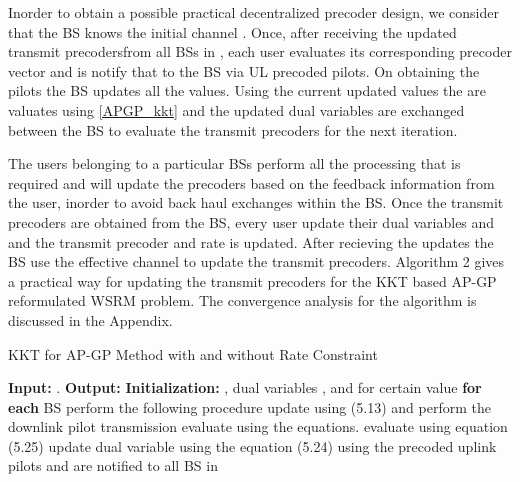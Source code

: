 Inorder to obtain a possible practical decentralized precoder design, we consider that the \ac{BS}  knows the initial channel . Once, after receiving the updated transmit precodersfrom all \ac{BS}s in , each user evaluates its corresponding precoder vector and is notify that to the \ac{BS} via \ac{UL} precoded pilots. On obtaining the pilots the \ac{BS} updates all the values. Using the current updated values the  are valuates using \eqref{APGP_kkt} and the updated dual variables are exchanged between the \ac{BS} to evaluate the transmit precoders for the next iteration.

The users belonging to a particular \ac{BS}s perform all the processing that is required and will update the precoders based on the feedback information from the user, inorder to avoid back haul exchanges within the \ac{BS}. Once the transmit precoders are obtained from the \ac{BS}, every user update their dual variables  and  and the transmit precoder  and rate  is updated. After recieving the updates the \ac{BS} use the effective channel to update the transmit precoders. Algorithm 2 gives a practical way for updating the transmit precoders for the \ac{KKT} based AP-GP reformulated \ac{WSRM} problem. The convergence analysis for the algorithm is discussed in the Appendix.

\begin{algorithm}
	\caption[Distributed Precoder Design]{KKT for AP-GP Method with and without Rate Constraint}
	\label{algo-2}
	\begin{algorithmic}
		\label{algo--2}
		\STATE \textbf{Input:} .
		\STATE \textbf{Output:} 
		\STATE \textbf{Initialization:}  , dual variables	, and  for certain value
		\REPEAT
		\STATE \textbf{for each} \ac{BS}  perform the following procedure
		\STATE update  using (5.13) and perform the downlink pilot transmission
		\STATE evaluate  using the equations. 
		\STATE evaluate  using equation (5.25)
		\STATE update dual variable  using the equation (5.24)
		\ENDIF
		\STATE using the precoded uplink pilots  and  are notified to all \ac{BS} in 
		\\
	\end{algorithmic} 
\end{algorithm}


